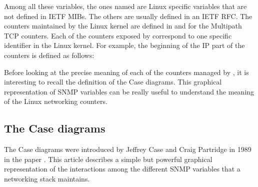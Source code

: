 \documentclass[letterpaper,10pt,english]{sphinxmanual}
\begin{document}
\sphinxAtStartPar
Among all these variables, the ones named  are Linux specific
variables that are not defined in IETF MIBs. The others are usually defined
in an IETF RFC. The counters maintained by the Linux kernel are defined in
 and
 for the Multipath TCP counters.
Each of the counters exposed by  correspond to one specific identifier
in the Linux kernel. For example, the beginning of the IP part of the
counters is defined as follows:

\begin{sphinxVerbatim}[commandchars=\\\{\}]
\end{sphinxVerbatim}

\sphinxAtStartPar
Before looking at the precise meaning of each of the counters managed by
,
it is interesting to recall the definition of the Case diagrams. This graphical
representation of SNMP variables can be really useful to understand the
meaning of the Linux networking counters.


\subsection{The Case diagrams}
\label{\detokenize{mptcp-linux:the-case-diagrams}}
\sphinxAtStartPar
The Case diagrams were introduced by Jeffrey Case and Craig
Partridge in 1989 in the paper .
This article describes a simple but powerful graphical representation
of the interactions among the different SNMP variables that a networking
stack maintains.
\end{document}
